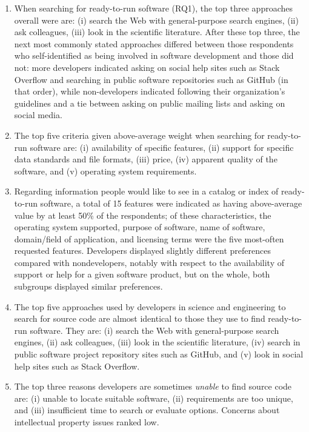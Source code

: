 \documentclass[review]{elsarticle}
\begin{document}
\begin{enumerate}

\item When searching for ready-to-run software (RQ1), the top three approaches overall were are: (i) search the Web with general-purpose search engines, (ii) ask colleagues, (iii) look in the scientific literature.  After these top three, the next most commonly stated approaches differed between those respondents who self-identified as being involved in software development and those did not: more developers indicated asking on social help sites such as Stack Overflow and searching in public software repositories such as GitHub (in that order), while non-developers indicated following their organization's guidelines and a tie between asking on public mailing lists and asking on social media.

\item The top five criteria given above-average weight when searching for ready-to-run software are: (i) availability of specific features, (ii) support for specific data standards and file formats, (iii) price, (iv) apparent quality of the software, and (v) operating system requirements.

\item Regarding information people would like to see in a catalog or index of ready-to-run software, a total of 15 features were indicated as having above-average value by at least 50\% of the respondents; of these characteristics, the operating system supported, purpose of software, name of software, domain/field of application, and licensing terms were the five most-often requested features.  Developers displayed slightly different preferences compared with nondevelopers, notably with respect to the availability of support or help for a given software product, but on the whole, both subgroups displayed similar preferences.

\item The top five approaches used by developers in science and engineering to search for source code are almost identical to those they use to find ready-to-run software.  They are: (i) search the Web with general-purpose search engines, (ii) ask colleagues, (iii) look in the scientific literature, (iv) search in public software project repository sites such as GitHub, and (v) look in social help sites such as Stack Overflow.  %

\item The top three reasons developers are sometimes \emph{unable} to find source code are: (i) unable to locate suitable software, (ii) requirements are too unique, and (iii) insufficient time to search or evaluate options.  Concerns about intellectual property issues ranked low.

\end{enumerate}
\end{document}
